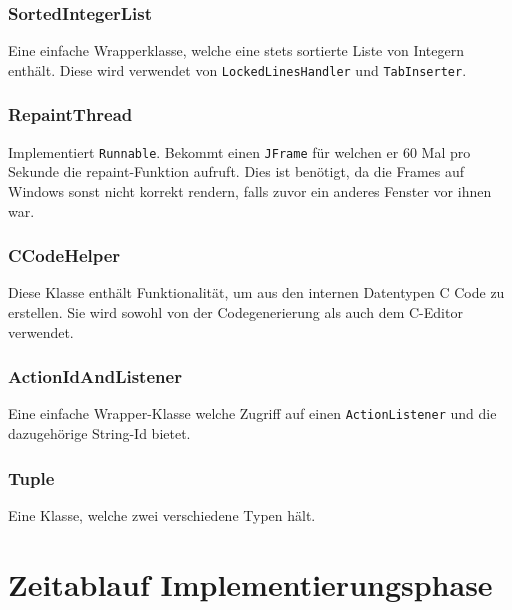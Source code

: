 \documentclass[a4paper]{scrreprt}
\begin{document}
\subsection{SortedIntegerList}
Eine einfache Wrapperklasse, welche eine stets sortierte Liste von Integern enthält. Diese wird verwendet von \verb!LockedLinesHandler! und \verb!TabInserter!.\\
\subsection{RepaintThread}
Implementiert \verb!Runnable!. Bekommt einen \verb!JFrame! für welchen er 60 Mal pro Sekunde die repaint-Funktion aufruft. Dies ist benötigt, da die Frames auf Windows sonst nicht korrekt rendern, falls zuvor ein anderes Fenster vor ihnen war.\\
\subsection{CCodeHelper}
Diese Klasse enthält Funktionalität, um aus den internen Datentypen C Code zu erstellen. Sie wird sowohl von der Codegenerierung als auch dem C-Editor verwendet. \\
\subsection{ActionIdAndListener}
Eine einfache Wrapper-Klasse welche Zugriff auf einen \verb!ActionListener! und die dazugehörige String-Id bietet.\\
\subsection{Tuple}
Eine Klasse, welche zwei verschiedene Typen hält.

\chapter{Zeitablauf Implementierungsphase}
\end{document}
